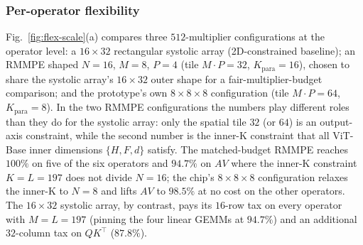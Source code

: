 \documentclass[lettersize,journal]{IEEEtran}
\begin{document}
\subsubsection{Per-operator flexibility} Fig.~\ref{fig:flex-scale}(a) compares three $512$-multiplier configurations at the operator level: a $16{\times}32$ rectangular systolic array (2D-constrained baseline); an RMMPE shaped $N{=}16$, $M{=}8$, $P{=}4$ (tile $M{\cdot}P{=}32$, $K_{\text{para}}{=}16$), chosen to share the systolic array's $16{\times}32$ outer shape for a fair-multiplier-budget comparison; and the prototype's own $8{\times}8{\times}8$ configuration (tile $M{\cdot}P{=}64$, $K_{\text{para}}{=}8$). In the two RMMPE configurations the numbers play different roles than they do for the systolic array: only the spatial tile $32$ (or $64$) is an output-axis constraint, while the second number is the inner-K constraint that all ViT-Base inner dimensions $\{H, F, d\}$ satisfy. The matched-budget RMMPE reaches $100\%$ on five of the six operators and $94.7\%$ on $AV$ where the inner-K constraint $K{=}L{=}197$ does not divide $N{=}16$; the chip's $8{\times}8{\times}8$ configuration relaxes the inner-K to $N{=}8$ and lifts $AV$ to $98.5\%$ at no cost on the other operators. The $16{\times}32$ systolic array, by contrast, pays its $16$-row tax on every operator with $M{=}L{=}197$ (pinning the four linear GEMMs at $94.7\%$) and an additional $32$-column tax on $QK^{\top}$ ($87.8\%$).
\end{document}

